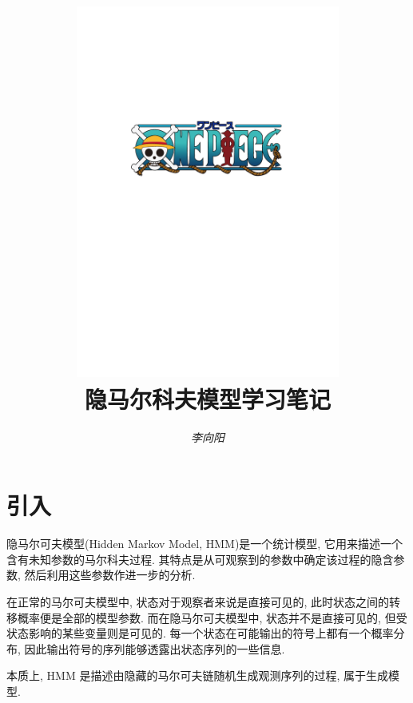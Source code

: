 \documentclass[a4paper,UTF8]{ctexart}
\theoremstyle{plain} \newtheorem{theorem}{定理}[section]
\theoremstyle{plain} \newtheorem{definition}{定义}[section]
\theoremstyle{plain} \newtheorem{lemma}{引理}[section]
\theoremstyle{plain} \newtheorem{proposition}{命题}[section]
\theoremstyle{plain} \newtheorem{example}{例}[section]
\theoremstyle{plain} \newtheorem{remark}{注}[section]
\theoremstyle{plain} \newtheorem{corollary}{推论}[section]
\begin{document}
\title{
\includegraphics[width=0.65\textwidth]{onepiece.pdf}\\
\vspace{2em}
\textbf{隐马尔科夫模型学习笔记}}
\author{\emph{李向阳}  }
\date{}


\maketitle
\thispagestyle{empty}

\newpage


\tableofcontents

\newpage

\section{引入}
隐马尔可夫模型(Hidden Markov Model, HMM)是一个统计模型, 它用来描述一个含有未知参数的马尔科夫过程. 其特点是从可观察到的参数中确定该过程的隐含参数, 然后利用这些参数作进一步的分析.

在正常的马尔可夫模型中, 状态对于观察者来说是直接可见的, 此时状态之间的转移概率便是全部的模型参数. 而在隐马尔可夫模型中, 状态并不是直接可见的, 但受状态影响的某些变量则是可见的. 每一个状态在可能输出的符号上都有一个概率分布, 因此输出符号的序列能够透露出状态序列的一些信息.

本质上, HMM 是描述由隐藏的马尔可夫链随机生成观测序列的过程, 属于生成模型.
\end{document}
